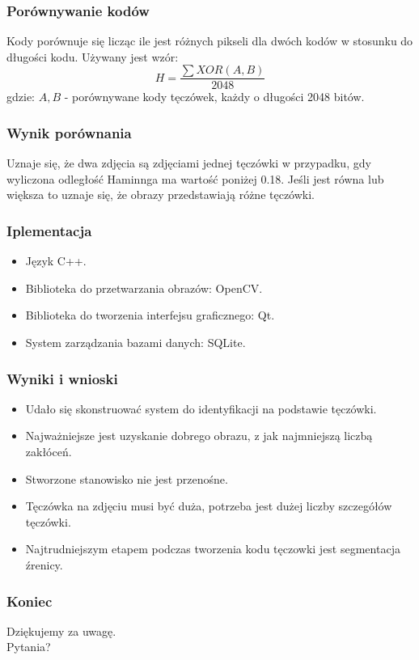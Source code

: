 \documentclass{beamer}
\begin{document}

\begin{frame}
\frametitle{Porównywanie kodów}
Kody porównuje się licząc ile jest różnych pikseli dla dwóch kodów w stosunku do długości kodu. Używany jest wzór:
$$ H = \frac{\sum XOR(A,B)}{2048} $$
gdzie:
$A, B$ - porównywane kody tęczówek, każdy o długości 2048 bitów.\\
\end{frame}


\begin{frame}
\frametitle{Wynik porównania}
Uznaje się, że dwa zdjęcia są zdjęciami jednej tęczówki w przypadku, gdy wyliczona odległość Haminnga ma wartość poniżej 0.18. Jeśli jest równa lub większa to uznaje się, że obrazy przedstawiają różne tęczówki.
\end{frame}


\begin{frame}
\frametitle{Iplementacja}
\begin{itemize}
\item Język C++.
\item Biblioteka do przetwarzania obrazów: OpenCV.
\item Biblioteka do tworzenia interfejsu graficznego: Qt.
\item System zarządzania bazami danych: SQLite.
\end{itemize}
\end{frame}



\begin{frame}
\frametitle{Wyniki i wnioski}
\begin{itemize}
\item Udało się skonstruować system do identyfikacji na podstawie tęczówki.
\item Najważniejsze jest uzyskanie dobrego obrazu, z jak najmniejszą liczbą zakłóceń.
\item Stworzone stanowisko nie jest przenośne.
\item Tęczówka na zdjęciu musi być duża, potrzeba jest dużej liczby szczegółów tęczówki.
\item Najtrudniejszym etapem podczas tworzenia kodu tęczowki jest segmentacja źrenicy.
\end{itemize}
\end{frame}


\begin{frame}
\frametitle{Koniec}

\begin{block}{}
Dziękujemy za uwagę.\\
Pytania?
\end{block}

\end{frame}

\end{document}
